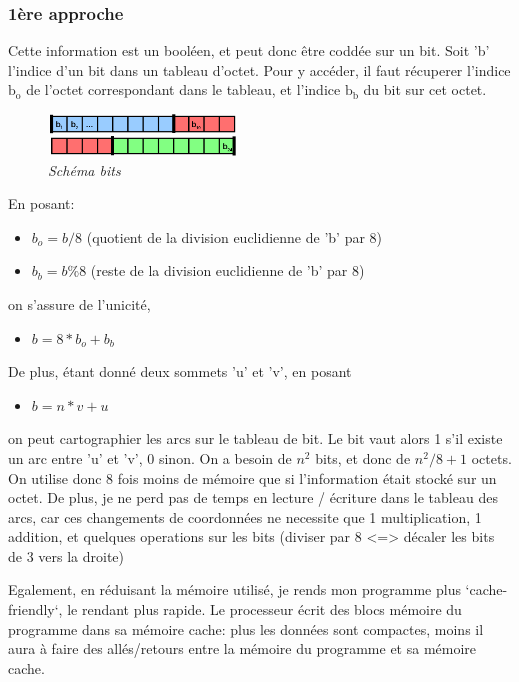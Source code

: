 \documentclass[10pt]{article}
\begin{document}
			\subsubsection{1ère approche}

				Cette information est un booléen, et peut donc être coddée sur un bit.
				Soit 'b' l'indice d'un bit dans un tableau d'octet.
				Pour y accéder, il faut récuperer l'indice $\textrm{b}_\textrm{o}$ de l'octet correspondant dans le tableau,
				et l'indice $\textrm{b}_\textrm{b}$ du bit sur cet octet.\newline
				
				\begin{figure}
					\includegraphics[width=5cm]{./images/bits.png}
					\caption{\textit{Schéma bits}}
				\end{figure}
				
				En posant:
				\begin{itemize}[label=-]
					\item \(b_o = b / 8\) (quotient de la division euclidienne de 'b' par 8)
					\item \(b_b = b \% 8\) (reste de la division euclidienne de 'b' par 8)
				\end{itemize}
				on s'assure de l'unicité,
				\begin{itemize}[label=-]
					\item \(b = 8*b_o+b_b\)
				\end{itemize}
				De plus, étant donné deux sommets 'u' et 'v', en posant
				\begin{itemize}[label=-]
					\item \(b = n * v + u\)
				\end{itemize}
				on peut cartographier les arcs sur le tableau de bit. Le bit vaut alors 1 s'il existe un arc entre 'u' et 'v', 0 sinon.
				On a besoin de \(n^2\) bits, et donc de \(n^2 / 8 + 1\) octets.
				On utilise donc 8 fois moins de mémoire que si l'information était stocké sur un octet.
				De plus, je ne perd pas de temps en lecture / écriture dans le tableau des arcs, car ces changements
				de coordonnées ne necessite que 1 multiplication, 1 addition, et quelques operations sur les bits (diviser par 8 <=> décaler
				les bits de 3 vers la droite)
				
				Egalement, en réduisant la mémoire utilisé, je rends mon programme plus `cache-friendly`, le rendant plus rapide.
				Le processeur écrit des blocs mémoire du programme dans sa mémoire cache: plus les données sont compactes,
				moins il aura à faire des allés/retours entre la mémoire du programme et sa mémoire cache.\newline
				
\end{document}
